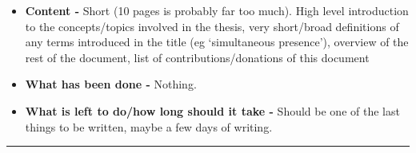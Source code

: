 \begin{itemize}
	\item \textbf{Content -} Short (10 pages is probably far too much). High level introduction to the concepts/topics involved in the thesis, very short/broad definitions of any terms introduced in the title (eg `simultaneous presence'), overview of the rest of the document, list of contributions/donations of this document
	\item \textbf{What has been done -} Nothing.
	\item \textbf{What is left to do/how long should it take -} Should be one of the last things to be written, maybe a few days of writing.
\end{itemize}

\hrule